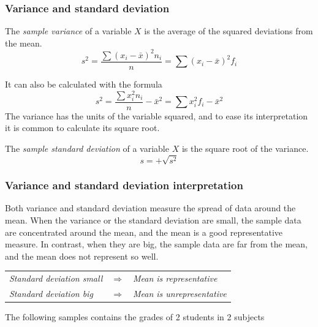 \begin{frame}
\frametitle{Variance and standard deviation}
\begin{definition}
The \emph{sample variance} of a variable $X$ is the average of the squared deviations from the mean. 
\[
s^2 = \frac{\sum (x_i-\bar x)^2n_i}{n} = \sum (x_i-\bar x)^2f_i
\]
\end{definition}
It can also be calculated with the formula
\[
s^2 = \frac{\sum x_i^2n_i}{n} -\bar x^2= \sum x_i^2f_i-\bar x^2
\]
The variance has the units of the variable squared, and to ease its interpretation it is common to calculate its square root.

\begin{definition}
The \emph{sample standard deviation} of a variable $X$ is the square root of the variance.
\[
s = +\sqrt{s^2}
\]
\end{definition}
\end{frame}


\begin{frame}
\frametitle{Variance and standard deviation interpretation}
Both variance and standard deviation measure the spread of data around the mean. 
When the variance or the standard deviation are small, the sample data are concentrated around the mean, and the mean is
a good representative measure. 
In contrast, when they are big, the sample data are far from the mean, and the mean does not represent so well. 
\begin{center}
\begin{tabular}{lcl}
\emph{Standard deviation small} & $\Rightarrow$ & \emph{Mean is representative}\\
\emph{Standard deviation big} & $\Rightarrow$ & \emph{Mean is unrepresentative}\\
\end{tabular}
\end{center}

 The following samples contains the grades of 2 students in 2 subjects 
\begin{center}
\scalebox{1}{}

\end{center}
\end{frame}


